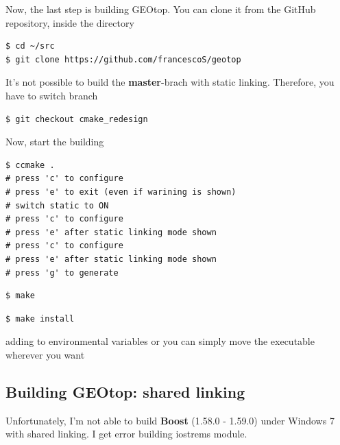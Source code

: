 Now, the last step is building GEOtop. You can clone it from the GitHub repository, inside the  directory

\begin{lstlisting}[style=bashStyle]
$ cd ~/src
$ git clone https://github.com/francescoS/geotop
\end{lstlisting}

It's not possible to build the \textbf{master}-brach with static linking. Therefore, you have to switch branch

\begin{lstlisting}[style=bashStyle]
$ git checkout cmake_redesign
\end{lstlisting} %

Now, start the building

\begin{lstlisting}[style=bashStyle]
$ ccmake .
# press 'c' to configure
# press 'e' to exit (even if warining is shown)
# switch static to ON
# press 'c' to configure
# press 'e' after static linking mode shown
# press 'c' to configure
# press 'e' after static linking mode shown
# press 'g' to generate
\end{lstlisting} %

\begin{lstlisting}[style=bashStyle]
$ make
\end{lstlisting} %

\begin{lstlisting}[style=bashStyle]
$ make install
\end{lstlisting} %

adding  to environmental variables or you can simply move the executable wherever you want

\subsection{Building GEOtop: shared linking}

Unfortunately, I'm not able to build \textbf{Boost} (1.58.0 - 1.59.0) under Windows 7 with shared linking. I get error building iostrems module.
